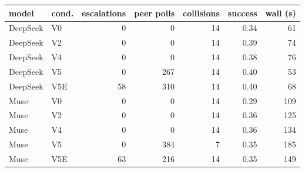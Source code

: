 \begin{tabular}{llrrrrr}
\toprule
model & cond. & escalations & peer polls & collisions & success & wall (s) \\
\midrule
DeepSeek & V0 & 0 & 0 & 14 & 0.34 & 61 \\
DeepSeek & V2 & 0 & 0 & 14 & 0.39 & 74 \\
DeepSeek & V4 & 0 & 0 & 14 & 0.38 & 76 \\
DeepSeek & V5 & 0 & 267 & 14 & 0.40 & 53 \\
DeepSeek & V5E & 58 & 310 & 14 & 0.40 & 68 \\
Muse & V0 & 0 & 0 & 14 & 0.29 & 109 \\
Muse & V2 & 0 & 0 & 14 & 0.36 & 125 \\
Muse & V4 & 0 & 0 & 14 & 0.36 & 134 \\
Muse & V5 & 0 & 384 & 7 & 0.35 & 185 \\
Muse & V5E & 63 & 216 & 14 & 0.35 & 149 \\
\bottomrule
\end{tabular}
